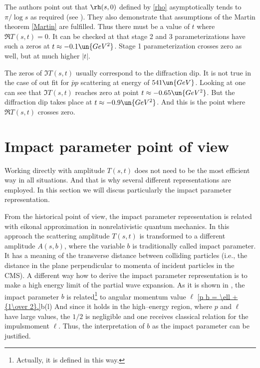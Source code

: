 The authors point out that $\rh(s, 0)$ defined by \equ{} \ref{rho} asymptotically tends to $\pi/\log s$ as required (see \fg{} ). They also demonstrate that assumptions of the Martin theorem \ref{Martin} are fulfilled. Thus there must be a value of $t$ where $\Re T(s, t) = 0$. It can be checked at \fg{}  that stage 2 and 3 parameterizations have such a zeros at $t \approx - 0.1\un{GeV^2}$. Stage 1 parameterization crosses zero as well, but at much higher $|t|$.

The zeros of $\Im T(s, t)$ usually correspond to the diffraction dip. It is not true in the case of out fit for $\bar pp$ scattering at energy of $541\un{GeV}$. Looking at \fg{}  one can see that $\Im T(s, t)$ reaches zero at point $t \approx -0.65\un{GeV^2}$. But the diffraction dip takes place at $t \approx - 0.9\un{GeV^2}$. And this is the point where $\Re T(s, t)$ crosses zero.

%
%
\emfig




\section{Impact parameter point of view}
Working directly with amplitude $T(s, t)$ does not need to be the most efficient way in all situations. And that is why several different representations are employed. In this section we will discus particularly the impact parameter representation. 

From the historical point of view, the impact parameter representation is related with eikonal approximation in nonrelativistic quantum mechanics. In this approach the scattering amplitude $T(s, t)$ is transformed to a different amplitude $A(s, b)$, where the variable $b$ is traditionally called impact parameter. It has a meaning of the transverse distance between colliding particles (i.e., the distance in the plane perpendicular to momenta of incident particles in the CMS). A different way how to derive the impact parameter representation is to make a high energy limit of the partial wave expansion. As it is shown in , the impact parameter $b$ is related\footnote{Actually, it is defined in this way.} to angular momentum value $\ell$
\eqref{p b = \ell + {1\over 2}.}{b(l)}
And since it holds in the high--energy region, where $p$ and $\ell$ have large values, the $1/2$ is negligible and one receives classical relation for the impulsmoment $\ell$. Thus, the interpretation of $b$ as the impact parameter can be justified.

